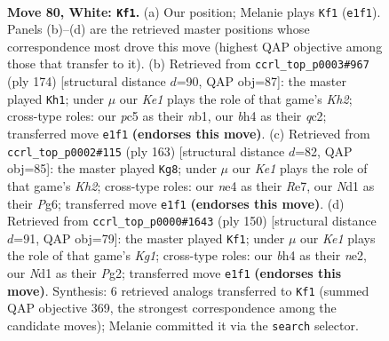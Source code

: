 \documentclass[11pt]{article}
\begin{document}
\clearpage

\begin{figure}[p]\centering
\begin{subfigure}{0.46\textwidth}\centering
\resizebox{\linewidth}{!}{%
\newchessgame
\chessboard[
  setfen={1r2q3/6k1/8/P1p2p2/2QpnPpb/4P3/R2B4/3NK3 w - - 3 80},
  showmover=false,
  pgfstyle=straightmove, color=movearrow, markmove={e1-f1}
]}
\caption{}
\end{subfigure}\hfill
\begin{subfigure}{0.46\textwidth}\centering
\resizebox{\linewidth}{!}{%
\newchessgame
\chessboard[
  setfen={1r6/8/kp2p3/3pP1P1/pQp2P2/P3B2R/2q4K/1n6 w - - 2 88},
  showmover=false,
  pgfstyle=straightmove, color=movearrow, markmove={h2-h1}
]}
\caption{}
\end{subfigure}
\\[4pt]
\begin{subfigure}{0.46\textwidth}\centering
\resizebox{\linewidth}{!}{%
\newchessgame
\chessboard[
  setfen={1q6/4r2k/3p2p1/2pPn1Np/2P4P/1PQ5/8/1K2R3 b - - 14 82},
  showmover=false,
  pgfstyle=straightmove, color=movearrow, markmove={h7-g8}
]}
\caption{}
\end{subfigure}\hfill
\begin{subfigure}{0.46\textwidth}\centering
\resizebox{\linewidth}{!}{%
\newchessgame
\chessboard[
  setfen={8/5Qpk/4p2p/3pP3/7q/3NBP2/4n1P1/6K1 w - - 5 76},
  showmover=false,
  pgfstyle=straightmove, color=movearrow, markmove={g1-f1}
]}
\caption{}
\end{subfigure}
\caption{\textbf{Move 80, White: \texttt{Kf1}.} (a) Our position; Melanie plays \texttt{Kf1} (\texttt{e1f1}). Panels (b)--(d) are the retrieved master positions whose correspondence most drove this move (highest QAP objective among those that transfer to it). (b) Retrieved from \texttt{ccrl\_top\_p0003\#967} (ply 174) [structural distance $d$=90, QAP obj=87]: the master played \texttt{Kh1}; under $\mu$ our \emph{Ke1} plays the role of that game's \emph{Kh2}; cross-type roles: our \emph{p}c5 as their \emph{n}b1, our \emph{b}h4 as their \emph{q}c2; transferred move \texttt{e1f1} \textbf{(endorses this move)}. (c) Retrieved from \texttt{ccrl\_top\_p0002\#115} (ply 163) [structural distance $d$=82, QAP obj=85]: the master played \texttt{Kg8}; under $\mu$ our \emph{Ke1} plays the role of that game's \emph{Kh2}; cross-type roles: our \emph{n}e4 as their \emph{R}e7, our \emph{N}d1 as their \emph{P}g6; transferred move \texttt{e1f1} \textbf{(endorses this move)}. (d) Retrieved from \texttt{ccrl\_top\_p0000\#1643} (ply 150) [structural distance $d$=91, QAP obj=79]: the master played \texttt{Kf1}; under $\mu$ our \emph{Ke1} plays the role of that game's \emph{Kg1}; cross-type roles: our \emph{b}h4 as their \emph{n}e2, our \emph{N}d1 as their \emph{P}g2; transferred move \texttt{e1f1} \textbf{(endorses this move)}. Synthesis: 6 retrieved analogs transferred to \texttt{Kf1} (summed QAP objective 369, the strongest correspondence among the candidate moves); Melanie committed it via the \texttt{search} selector.}
\label{fig:thought-m158}
\end{figure}
\end{document}
